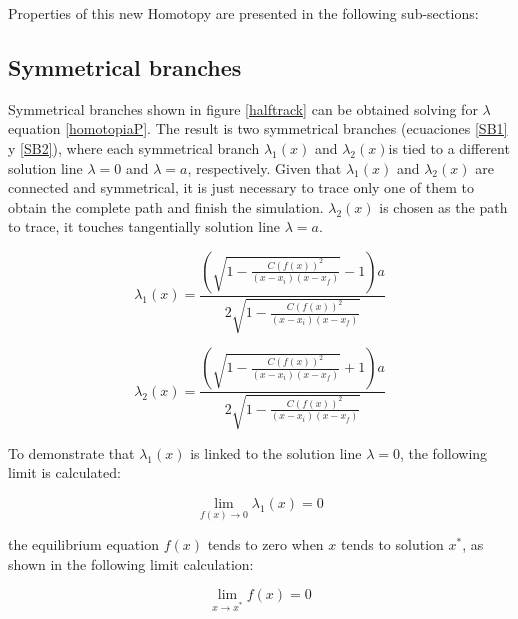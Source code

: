 \documentclass[journal,twocolumn]{IEEEtran}
\begin{document}
Properties of this new Homotopy are presented in the following sub-sections:

\subsection{Symmetrical branches}

Symmetrical branches shown in figure \ref{halftrack} can be obtained solving for $\lambda$ equation \ref{homotopiaP}. The result is two symmetrical branches (ecuaciones \ref{SB1} y \ref{SB2}), where each symmetrical branch $\lambda_1(x)$ and $\lambda_2(x)$is tied to a different solution line $\lambda=0$ and $\lambda=a$, respectively. Given that $\lambda_1(x)$ and $\lambda_2(x)$ are connected and symmetrical, it is just necessary to trace only one of them to obtain the complete path and finish the simulation. $\lambda_2(x)$ is chosen as the path to trace, it touches tangentially solution line $\lambda=a$.

\begin{equation}
\lambda_1(x)= {\frac {\left( \sqrt {1-{\frac {C \left( f \left( x \right)  \right) ^{2
}}{ \left( x-x_i \right)  \left( x-x_f \right) }}}-1
 \right) a}{2\sqrt {1-{\frac {C \left( f \left( x \right) 
 \right) ^{2}}{ \left( x-x_i \right)  \left( x-x_f
 \right) }}}}}
\label{SB1}
\end{equation}

\begin{equation}
\lambda_2(x)= {\frac {\left( \sqrt {1-{\frac {C \left( f \left( x \right)  \right) ^{2
}}{ \left( x-x_i \right)  \left( x-x_f \right) }}}+1
 \right) a}{2\sqrt {1-{\frac {C \left( f \left( x \right) 
 \right) ^{2}}{ \left( x-x_i \right)  \left( x-x_f
 \right) }}}}}
\label{SB2}
\end{equation}

To demonstrate that $\lambda_1(x)$ is linked to the solution line $\lambda=0$, the following limit is calculated:

\begin{equation}
 \displaystyle\lim_{f(x) \to{0}}{\lambda_1(x)}=0 
 \label{demos1x}
\end{equation}

the equilibrium equation $f(x)$ tends to zero when $x$ tends to solution $x^*$, as shown in the following limit calculation:

\begin{equation}
 \displaystyle\lim_{x \to{x^*}}{f(x)}=0 
 \label{demos1x2}
\end{equation}
\end{document}

